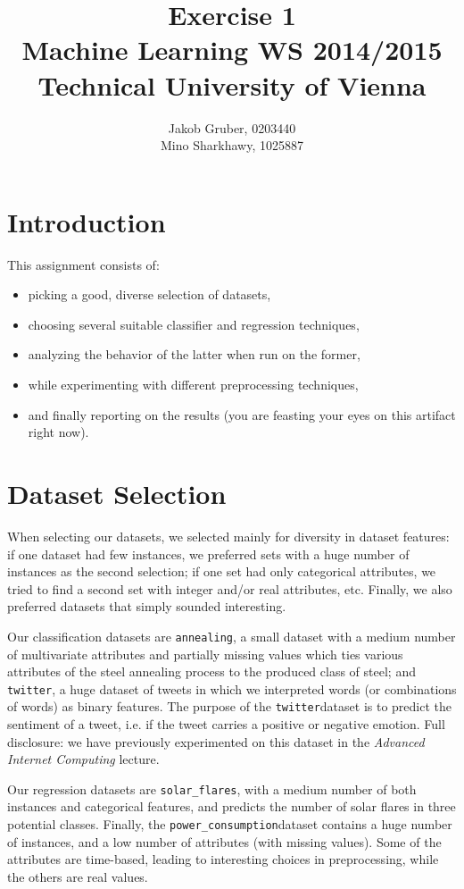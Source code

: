 \documentclass[a4paper,10pt]{article}
\title{Exercise 1 \\
       Machine Learning WS 2014/2015 \\
       Technical University of Vienna}
\author{Jakob Gruber, 0203440 \\
        Mino Sharkhawy, 1025887}
\newcommand{\annealing}{\texttt{annealing}}
\newcommand{\powerconsumption}{\texttt{power\_consumption}}
\newcommand{\solarflares}{\texttt{solar\_flares}}
\newcommand{\twitter}{\texttt{twitter}}
\begin{document}
\maketitle

\section{Introduction}

This assignment consists of:

\begin{itemize}
\item picking a good, diverse selection of datasets,
\item choosing several suitable classifier and regression techniques,
\item analyzing the behavior of the latter when run on the former,
\item while experimenting with different preprocessing techniques,
\item and finally reporting on the results (you are feasting your eyes on this
      artifact right now).
\end{itemize}

\section{Dataset Selection}

When selecting our datasets, we selected mainly for diversity in dataset features:
if one dataset had few instances, we preferred sets with a huge number of instances
as the second selection; if one set had only categorical attributes, we tried to
find a second set with integer and/or real attributes, etc. Finally, we also
preferred datasets that simply sounded interesting.

Our classification datasets are \annealing, a small dataset with a medium
number of multivariate attributes and partially missing values which ties various
attributes of the steel annealing process to the produced class of steel;
and \twitter, a huge dataset of tweets in which we interpreted words (or combinations of words)
as binary features. The purpose of the \twitter dataset is to predict the sentiment
of a tweet, i.e. if the tweet carries a positive or negative emotion.
Full disclosure: we have previously experimented on this dataset
in the \emph{Advanced Internet Computing} lecture.

Our regression datasets are \solarflares, with a medium number of both
instances and categorical features, and predicts the number of solar flares in
three potential classes. Finally, the \powerconsumption dataset contains
a huge number of instances, and a low number of  attributes (with missing values).
Some of the attributes are time-based, leading to interesting choices in preprocessing,
while the others are real values.
\end{document}
